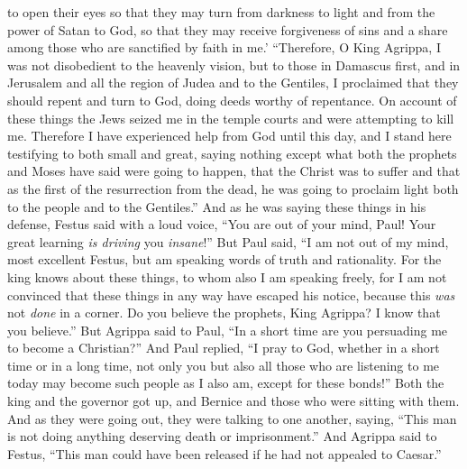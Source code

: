 \begin{biblechapter}
\verse to open their eyes so that they may turn from darkness to light and from the power of Satan to God, so that they may receive forgiveness of sins and a share among those who are sanctified by faith in me.’
\verse “Therefore, O King Agrippa, I was not disobedient to the heavenly vision,
\verse but to those in Damascus first, and in Jerusalem and all the region of Judea and to the Gentiles, I proclaimed that they should repent and turn to God, doing deeds worthy of repentance.
\verse On account of these things the Jews seized me in the temple courts and were attempting to kill me.
\verse Therefore I have experienced help from God until this day, and I stand here testifying to both small and great, saying nothing except what both the prophets and Moses have said were going to happen,
\verse that the Christ was to suffer and that as the first of the resurrection from the dead, he was going to proclaim light both to the people and to the Gentiles.”
\verse And as he was saying these things in his defense, Festus said with a loud voice, “You are out of your mind, Paul! Your great learning \textit{is driving} you \textit{insane}!”
\verse But Paul said, “I am not out of my mind, most excellent Festus, but am speaking words of truth and rationality.
\verse For the king knows about these things, to whom also I am speaking freely, for I am not convinced that these things in any way have escaped his notice, because this \textit{was} not \textit{done} in a corner.
\verse Do you believe the prophets, King Agrippa? I know that you believe.”
\verse But Agrippa said to Paul, “In a short time are you persuading me to become a Christian?”
\verse And Paul replied, “I pray to God, whether in a short time or in a long time, not only you but also all those who are listening to me today may become such people as I also am, except for these bonds!”
\verse Both the king and the governor got up, and Bernice and those who were sitting with them.
\verse And as they were going out, they were talking to one another, saying, “This man is not doing anything deserving death or imprisonment.”
\verse And Agrippa said to Festus, “This man could have been released if he had not appealed to Caesar.”
\end{biblechapter}


